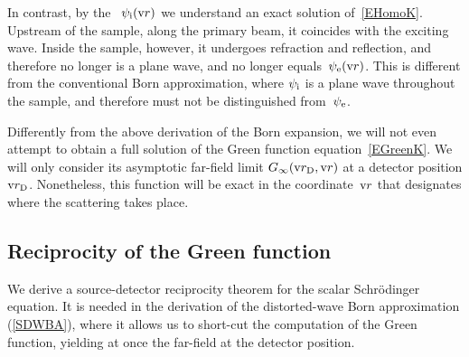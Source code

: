 In contrast, by the ~$\psi_{\text{i}}(\text{v}{r})$
%
%
%
we understand an exact solution of~\cref{EHomoK}.
Upstream of the sample, along the primary beam, it coincides with the exciting wave.
Inside the sample, however, it undergoes refraction and reflection,
and therefore no longer is a plane wave, and no longer equals~$\psi_{\text{e}}(\text{v}{r})$.
This is different from the conventional Born approximation,
where $\psi_{\text{i}}$ is a plane wave throughout the sample,
and therefore must not be distinguished from~$\psi_{\text{e}}$.

Differently from the above derivation of the Born expansion,
we will not even attempt to obtain a full solution
%
of the Green function equation~\cref{EGreenK}.
We will only consider its asymptotic far-field limit $G_\infty(\text{v}{r}_\text{D},\text{v}{r})$
at a detector position $\text{v}{r}_\text{D}$.
Nonetheless, this function will be exact in the coordinate~$\text{v}{r}$
that designates where the scattering takes place.
%

\subsection{Reciprocity of the Green function}\label{SReci}


We derive a source-detector reciprocity theorem
%
%
for the scalar Schrödinger equation.
It is needed in the derivation of the distorted-wave Born approximation
(\cref{SDWBA}),
where it allows us to short-cut the computation of the Green function,
yielding at once the far-field at the detector position.

